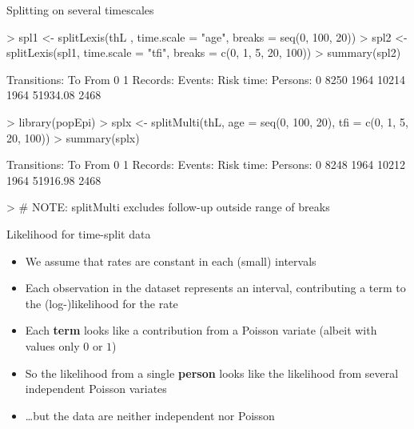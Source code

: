 \begin{frame}[fragile]{Splitting on several timescales}
\vspace*{-1em}
\begin{Schunk}
\begin{Sinput}
> spl1 <- splitLexis(thL , time.scale = "age", breaks = seq(0, 100, 20))
> spl2 <- splitLexis(spl1, time.scale = "tfi", breaks = c(0, 1, 5, 20, 100))
> summary(spl2)
\end{Sinput}
\begin{Soutput}
Transitions:
     To
From    0    1  Records:  Events: Risk time:  Persons:
   0 8250 1964     10214     1964   51934.08      2468
\end{Soutput}
\begin{Sinput}
> library(popEpi)
> splx <- splitMulti(thL, age = seq(0, 100, 20), tfi = c(0, 1, 5, 20, 100))
> summary(splx)
\end{Sinput}
\begin{Soutput}
Transitions:
     To
From    0    1  Records:  Events: Risk time:  Persons:
   0 8248 1964     10212     1964   51916.98      2468
\end{Soutput}
\begin{Sinput}
> # NOTE: splitMulti excludes follow-up outside range of breaks
\end{Sinput}
\end{Schunk}
\end{frame}

\begin{frame}[fragile]{Likelihood for time-split data}
  \begin{itemize}[<+->]
  \item We assume that rates are constant in each (small) intervals
  \item Each observation in the dataset represents an interval,
    contributing a term to the (log-)likelihood for the rate
  \item Each \textbf{term} \alert<4->{looks like} a contribution from a Poisson variate
    (albeit with values only $0$ or $1$)
  \item So the likelihood from a single \textbf{person}
    \alert<4->{looks like} the likelihood from several independent
    Poisson variates
  \item \ldots but the data are neither independent nor Poisson
  \end{itemize}
\end{frame}

